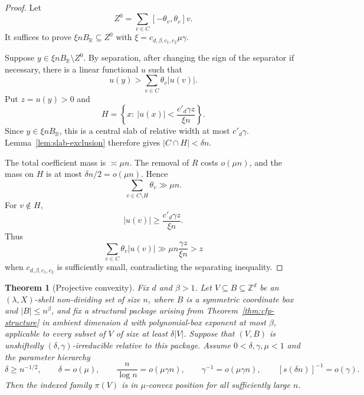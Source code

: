 \documentclass[11pt,reqno]{amsart}
\newtheorem{theorem}{Theorem}[section]
\theoremstyle{definition}
\theoremstyle{remark}
\newcommand{\Z}{\mathbb Z}
\newcommand{\R}{\mathbb R}
\begin{document}
\begin{proof}
Let
\[
 Z^0=\sum_{v\in C}[-\theta_v,\theta_v]v.
\]
It suffices to prove $\xi nB_{\R}\subseteq Z^0$ with
$\xi=c_{d,\beta,c_1,c_2}\mu\gamma$.

Suppose $y\in\xi nB_{\R}\setminus Z^0$.  By separation, after changing the sign of the separator if necessary, there is a linear functional $u$ such that
\[
 u(y)>\sum_{v\in C}\theta_v|u(v)|.
\]
Put $z=u(y)>0$ and
\[
 H=\left\{x:\ |u(x)|<\frac{c'_d\gamma z}{\xi n}\right\}.
\]
Since $y\in\xi nB_{\R}$, this is a central slab of relative width at most $c'_d\gamma$.  Lemma~\ref{lem:slab-exclusion} therefore gives $|C\cap H|<\delta n$.

The total coefficient mass is $\asymp\mu n$.  The removal of $R$ costs $o(\mu n)$, and the mass on $H$ is at most $\delta n/2=o(\mu n)$.  Hence
\[
 \sum_{v\in C\setminus H}\theta_v\gg\mu n.
\]
For $v\notin H$,
\[
 |u(v)|\ge\frac{c'_d\gamma z}{\xi n}.
\]
Thus
\[
 \sum_{v\in C}\theta_v|u(v)|
 \gg \mu n\frac{\gamma z}{\xi n}>z
\]
when $c_{d,\beta,c_1,c_2}$ is sufficiently small, contradicting the separating
inequality.
\end{proof}

\begin{theorem}[Projective convexity]
\label{thm:projective-convexity}
Fix $d$ and $\beta>1$.  Let $V\subseteq B\subseteq\Z^d$ be an
$(\lambda,X)$-shell non-dividing set of size $n$, where $B$ is a
symmetric coordinate box and $|B|\le n^\beta$, and fix a structural
package arising from Theorem~\ref{thm:cfp-structure} in ambient dimension
$d$ with polynomial-box exponent at most $\beta$, applicable to every subset
of $V$ of size at least $\delta|V|$.  Suppose that $(V,B)$ is unshiftedly
$(\delta,\gamma)$-irreducible relative to this package.  Assume
$0<\delta,\gamma,\mu<1$ and the parameter hierarchy
\[
 \delta\ge n^{-1/2},
 \qquad
 \delta=o(\mu),
 \qquad
 \frac{n}{\log n}=o(\mu\gamma n),
 \qquad
 \gamma^{-1}=o(\mu\gamma n),
 \qquad
 [s(\delta n)]^{-1}=o(\gamma).
\]
Then the indexed family $\pi(V)$ is in $\mu$-convex position for all sufficiently large $n$.
\end{theorem}
\end{document}
